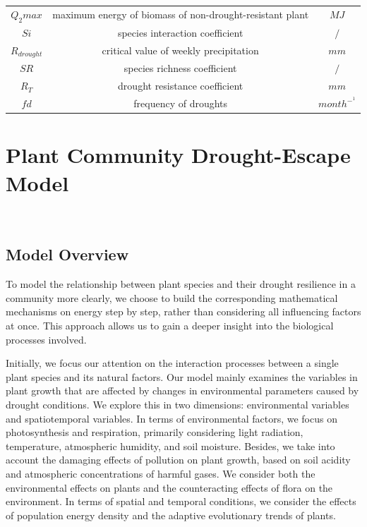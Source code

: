 \documentclass[12pt]{article}  %
\begin{document}
\begin{table}[!htbp]
\begin{tabular}{ccc}
$Q_2max$   & maximum energy of biomass  of non-drought-resistant plant  & $MJ$ \\
$Si$   & species interaction coefficient      & $/$ \\
$R_{drought}$   & critical value of weekly precipitation   & $mm$ \\
$SR$   & species richness coefficient    & $/$ \\
$R_T$   & drought resistance coefficient   & $mm$ \\
	$fd$   & frequency of droughts & $month^-^1$ \\
  \bottomrule[1.5pt]
	\end{tabular}
\end{table}

\vspace{-0.6cm}
\section{Plant Community Drought-Escape Model}
\vspace{-0.3cm}
\\
\vspace{-0.3cm}
\subsection{Model Overview}

\vspace{-0.3cm}
To model the relationship between plant species and their drought resilience in a community more clearly, we choose to build the corresponding mathematical mechanisms on energy step by step, rather than considering all influencing factors at once. This approach allows us to gain a deeper insight into the biological processes involved.

Initially, we focus our attention on the interaction processes between a single plant species and its natural factors. Our model mainly examines the variables in plant growth that are affected by changes in environmental parameters caused by drought conditions. We explore this in two dimensions: environmental variables and spatiotemporal variables. In terms of environmental factors, we focus on photosynthesis and respiration, primarily considering light radiation, temperature, atmospheric humidity, and soil moisture. Besides, we take into account the damaging effects of pollution on plant growth, based on soil acidity and atmospheric concentrations of harmful gases. We consider both the environmental effects on plants and the counteracting effects of flora on the environment. In terms of spatial and temporal conditions, we consider the effects of population energy density and the adaptive evolutionary trends of plants.
\end{document}
